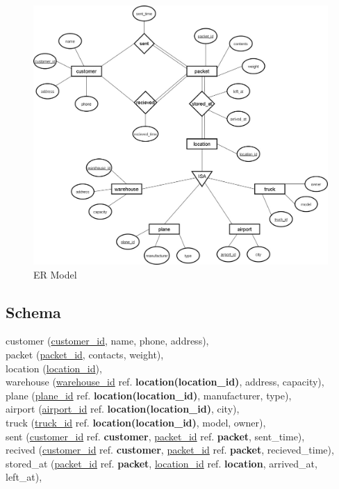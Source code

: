 \documentclass{article}
\begin{document}
\newpage
\begin{figure}[!ht]
  \begin{center}
    \includegraphics[scale=0.4]{2.jpg}
  \caption{ER Model}
  \end{center}
\end{figure}

\newpage
\subsection{Schema}
\onehalfspacing
\begin{center}
  customer (\underline{customer\_id}, name, phone, address), \\
  packet (\underline{packet\_id}, contacts, weight), \\
  location (\underline{location\_id}), \\
  warehouse (\underline{warehouse\_id} ref. \textbf{location(location\_id)}, address, capacity), \\
  plane (\underline{plane\_id} ref. \textbf{location(location\_id)}, manufacturer, type), \\
  airport (\underline{airport\_id} ref. \textbf{location(location\_id)}, city), \\
  truck (\underline{truck\_id} ref. \textbf{location(location\_id)}, model, owner), \\
  sent (\underline{customer\_id} ref. \textbf{customer}, \underline{packet\_id} ref. \textbf{packet}, sent\_time), \\
  recived (\underline{customer\_id} ref. \textbf{customer}, \underline{packet\_id} ref. \textbf{packet}, recieved\_time), \\
  stored\_at (\underline{packet\_id} ref. \textbf{packet}, \underline{location\_id} ref. \textbf{location}, arrived\_at, left\_at), \\
\end{center}
\end{document}
